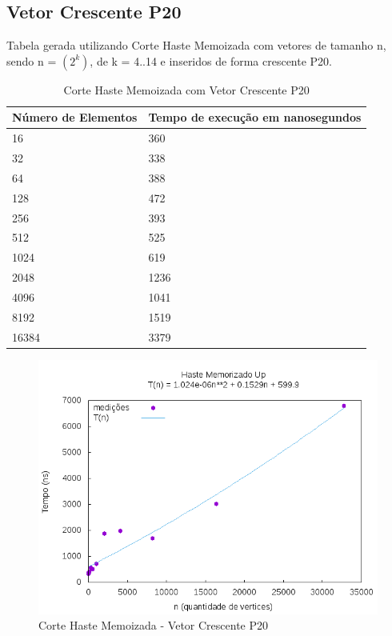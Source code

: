 \documentclass[12pt,a4paper,twoside]{report}
\begin{document}
\subsection{Vetor Crescente P20}
Tabela gerada utilizando Corte Haste Memoizada com vetores de tamanho n, sendo n = $(2^k)$, de k = 4..14 e inseridos de forma crescente P20.
\begin{table}[H]
\centering
\caption{Corte Haste Memoizada com Vetor Crescente P20}
\label{my-label}
\begin{tabular}{|l|l|}
\hline
\multicolumn{1}{|c|}{\textbf{Número de Elementos}} & \multicolumn{1}{c|}{\textbf{Tempo de execução em nanosegundos}} \\ \hline
16 & 360 \\ \hline
32 & 338 \\ \hline
64 & 388 \\ \hline
128 & 472 \\ \hline
256 & 393 \\ \hline
512 & 525 \\ \hline
1024 & 619 \\ \hline
2048 & 1236 \\ \hline
4096 & 1041 \\ \hline
8192 & 1519 \\ \hline
16384 & 3379 \\ \hline

\end{tabular}
\end{table}

\begin{figure}[H]
    \centering
    \includegraphics[width=0.7\linewidth]{graficos/CorteHasteMemorizado/Crescente P20/HasteMemo.png}
  \caption{Corte Haste Memoizada - Vetor Crescente P20}
\end{figure}
\end{document}
